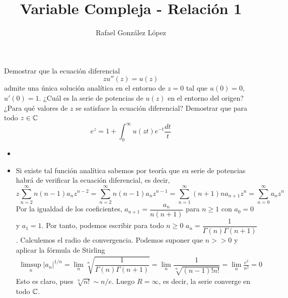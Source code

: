 \documentclass[twoside]{article}
\begin{document}
\title{Variable Compleja - Relación 1}
\author{Rafael González López}
\maketitle

\begin{ejercicio}{1}
Demostrar que la ecuación diferencial
$$
zu''(z)=u(z)$$
admite una única solución analítica en el entorno de $z=0$ tal que $u(0)=0$, $u'(0)=1$.
¿Cuál es la serie de potencias de $u(z)$ en el entorno del origen? ¿Para qué valores de $z$ se satisface la ecuación diferencial?
Demostrar que para todo $z\in \mathbb{C}$ 
$$
e^z = 1 +  \int_0^\infty u(zt)e^{-t}\frac{dt}{t}
$$
\begin{solucion}
\begin{itemize}
\item[]
\item Si existe tal función analítica sabemos por teoría que su serie de potencias habrá de verificar la ecuación diferencial, es decir,
$$
z\sum_{n=2}^\infty n(n-1) a_n z^{n-2}= \sum_{n=2}^\infty n(n-1 )a_{n} z^{n-1} =  \sum_{n=1}^\infty (n+1)na_{n+1} z^{n} = \sum_{n=0}^\infty a_n z^n
$$
Por la igualdad de los coeficientes, $a_{n+1}=\dfrac{a_n}{n(n+1)}$ para $n\geq 1$ con $a_0 = 0$ y $a_1=1$. Por tanto, podemos escribir para todo $n\geq 0$ $a_n = \dfrac{1}{\Gamma(n)\Gamma(n+1)}$. Calculemos el radio de convergencia. Podemos suponer que $n>>0$ y aplicar la fórmula de Stirling
\begin{gather*}
\limsup_n |a_n|^{1/n} = \lim_n \sqrt[n]{\dfrac{1}{\Gamma(n)\Gamma(n+1)}} = \lim_n {\dfrac{1}{\sqrt[n]{(n-1)!n!}}} = \lim_n \frac{e^2}{n^2} = 0
\end{gather*}
Esto es claro, pues $\sqrt[n]{n!}\sim n/e$. Luego $R=\infty$, es decir, la serie converge en todo $\mathbb{C}$. 


\end{itemize}
\end{solucion}
\end{ejercicio}
\end{document}

